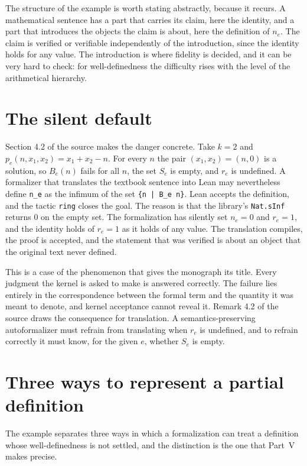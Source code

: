 The structure of the example is worth stating abstractly, because it recurs. A mathematical sentence has a part that carries its claim, here the identity, and a part that introduces the objects the claim is about, here the definition of $n_e$. The claim is verified or verifiable independently of the introduction, since the identity holds for any value. The introduction is where fidelity is decided, and it can be very hard to check: for well-definedness the difficulty rises with the level of the arithmetical hierarchy.

\section{The silent default}

Section 4.2 of the source makes the danger concrete. Take $k = 2$ and $p_e(n, x_1, x_2) = x_1 + x_2 - n$. For every $n$ the pair $(x_1, x_2) = (n, 0)$ is a solution, so $B_e(n)$ fails for all $n$, the set $S_e$ is empty, and $r_e$ is undefined. A formalizer that translates the textbook sentence into Lean may nevertheless define \texttt{n\_e} as the infimum of the set \texttt{\{n | B\_e n\}}. Lean accepts the definition, and the tactic \texttt{ring} closes the goal. The reason is that the library's \texttt{Nat.sInf} returns $0$ on the empty set. The formalization has silently set $n_e = 0$ and $r_e = 1$, and the identity holds of $r_e = 1$ as it holds of any value. The translation compiles, the proof is accepted, and the statement that was verified is about an object that the original text never defined.

This is a case of the phenomenon that gives the monograph its title. Every judgment the kernel is asked to make is answered correctly. The failure lies entirely in the correspondence between the formal term and the quantity it was meant to denote, and kernel acceptance cannot reveal it. Remark 4.2 of the source draws the consequence for translation. A semantics-preserving autoformalizer must refrain from translating when $r_e$ is undefined, and to refrain correctly it must know, for the given $e$, whether $S_e$ is empty.

\section{Three ways to represent a partial definition}

The example separates three ways in which a formalization can treat a definition whose well-definedness is not settled, and the distinction is the one that Part~V makes precise.

